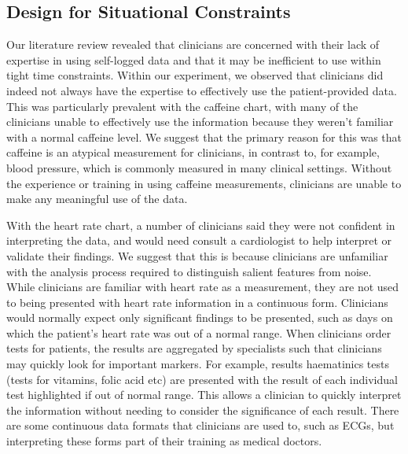 \documentclass{sigchi}
\begin{document}


\subsection{Design for Situational Constraints} %



Our literature review revealed that clinicians are concerned with their lack of expertise in using self-logged data and that it may be inefficient to use within tight time constraints. Within our experiment, we observed that clinicians did indeed not always have the expertise to effectively use the patient-provided data. This was particularly prevalent with the caffeine chart, with many of the clinicians unable to effectively use the information because they weren't familiar with a normal caffeine level. We suggest that the primary reason for this was that caffeine is an atypical measurement for clinicians, in contrast to, for example, blood pressure, which is commonly measured in many clinical settings. Without the experience or training in using caffeine measurements, clinicians are unable to make any meaningful use of the data.

With the heart rate chart, a number of clinicians said they were not confident in interpreting the data, and would need consult a cardiologist to help interpret or validate their findings. We suggest that this is because clinicians are unfamiliar with the analysis process required to distinguish salient features from noise. While clinicians are familiar with heart rate as a measurement, they are not used to being presented with heart rate information in a continuous form. Clinicians would normally expect only significant findings to be presented, such as days on which the patient's heart rate was out of a normal range.  When clinicians order tests for patients, the results are aggregated by specialists such that clinicians may quickly look for important markers. For example, results haematinics tests (tests for vitamins, folic acid etc) are presented with the result of each individual test highlighted if out of normal range. This allows a clinician to quickly interpret the information without needing to consider the significance of each result. There are some continuous data formats that clinicians are used to, such as ECGs, but interpreting these forms part of their training as medical doctors.
\end{document}
